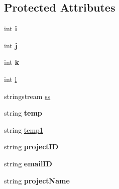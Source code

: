 \subsection*{Protected Attributes}
\begin{DoxyCompactItemize}
\item 
\hypertarget{classInputDetail_a2e9226db1b744de4bf406398f48cf962}{int {\bfseries i}}\label{classInputDetail_a2e9226db1b744de4bf406398f48cf962}

\item 
\hypertarget{classInputDetail_af124a26cb4e4f86d0d9eb68200ee500b}{int {\bfseries j}}\label{classInputDetail_af124a26cb4e4f86d0d9eb68200ee500b}

\item 
\hypertarget{classInputDetail_a1bb6b8bff3d5fc6d5c998e4c451035bc}{int {\bfseries k}}\label{classInputDetail_a1bb6b8bff3d5fc6d5c998e4c451035bc}

\item 
int \hyperlink{classInputDetail_a3a950727518c2f6ed3c068125a037b9e}{l}
\item 
stringstream \hyperlink{classInputDetail_a5284736b5fd3db0251cfeab7c581c0bd}{ss}
\item 
\hypertarget{classInputDetail_abacd5d7ee7ebd7e9f36bbf3fefd13a5d}{string {\bfseries temp}}\label{classInputDetail_abacd5d7ee7ebd7e9f36bbf3fefd13a5d}

\item 
string \hyperlink{classInputDetail_aa5659e496977cc83f743725f6aaf2d6a}{temp1}
\item 
\hypertarget{classInputDetail_a08069ee622c626c038b821ddcc7427b4}{string {\bfseries project\-I\-D}}\label{classInputDetail_a08069ee622c626c038b821ddcc7427b4}

\item 
\hypertarget{classInputDetail_ad3f1db4fddbe0d4efbf1d5bc74d52257}{string {\bfseries email\-I\-D}}\label{classInputDetail_ad3f1db4fddbe0d4efbf1d5bc74d52257}

\item 
\hypertarget{classInputDetail_aaaf51475a2a4ddbe34e38c96bdb45bad}{string {\bfseries project\-Name}}\label{classInputDetail_aaaf51475a2a4ddbe34e38c96bdb45bad}


\end{DoxyCompactItemize}
